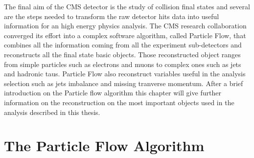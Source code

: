 
	
	


	
	
	


The final aim of the CMS detector is the study of collision final states and several are the steps needed to transform the raw detector hits data into useful information for an high energy physics analysis. The CMS research collaboration converged its effort into a complex software algorithm, called Particle Flow, that combines all the information coming from all the experiment sub-detectors and reconstructs all the final state basic objects. Those reconstructed object ranges from simple particles such as electrons and muons to complex ones such as jets and hadronic taus. Particle Flow also reconstruct variables useful in the analysis selection such as jets imbalance and missing tranverse momentum. After a brief introduction on the Particle flow algorithm this chapter will give further information on the reconstruction on the most important objects used in the analysis described in this thesis.

\section{The Particle Flow Algorithm}

